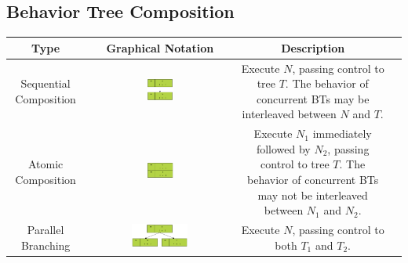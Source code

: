 \documentclass[]{article}
\begin{document}
\begin{landscape}
\onehalfspacing

\subsection{Behavior Tree Composition}

\singlespacing
\begin{center}
\begin{longtable}[c]{|c|c|c|p{}|} \hline
\textbf{Type} & \textbf{Graphical Notation} &  \textbf{Description} \\*
\hline 
\hline
\multirow{6}{*}{Sequential Composition}&\multirow{6}{*}{\includegraphics[width=0.189\textwidth]{figs/AppendixB/Composition/Sequential.pdf}} &\multirow{6}{0.65\textwidth}{Execute $N$, passing control to tree $T$. The behavior of concurrent BTs may be interleaved between $N$ and $T$.}\\*
&&\\*
&&\\*
&&\\*
&&\\*
&&\\*
\hline
\multirow{4}{*}{Atomic Composition}&\multirow{4}{*}{\includegraphics[width=0.189\textwidth]{figs/AppendixB/Composition/Atomic.pdf}} & \multirow{4}{0.65\textwidth}{Execute $N_1$ immediately followed by $N_2$, passing control to tree $T$. The behavior of concurrent BTs may not be interleaved between $N_1$ and $N_2$.} \\*
&&\\*
&&\\*
&&\\*
\hline
\multirow{6}{*}{Parallel Branching}&\multirow{6}{*}{\includegraphics[width=0.4\textwidth]{figs/AppendixB/Composition/Parallel.pdf}} &  \multirow{6}{0.65\textwidth}{Execute $N$, passing control to both $T_1$ and $T_2$.} \\*

\end{longtable}
\end{center}
\end{landscape}
\end{document}
